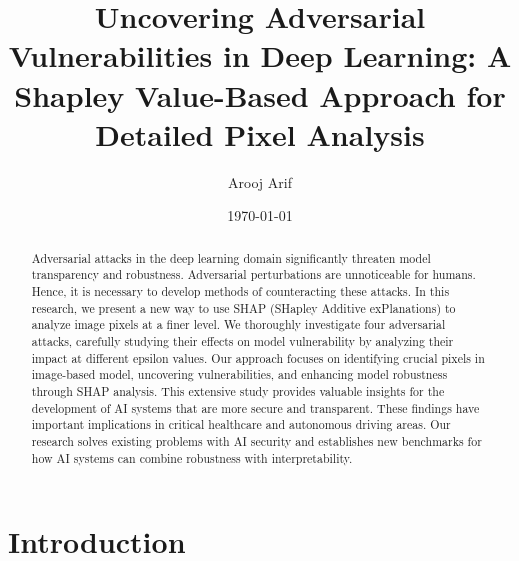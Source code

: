 \documentclass[10pt, conference, a4paper, final]{IEEEtran}
\title{Uncovering Adversarial Vulnerabilities in Deep Learning: A Shapley Value-Based Approach for Detailed Pixel Analysis}
\author{Arooj Arif}
\date{\today} %
\begin{document}
\maketitle %


\begin{abstract}    
    Adversarial attacks in the deep learning domain significantly threaten model transparency and robustness. Adversarial perturbations are unnoticeable for humans. Hence, it is necessary to develop methods of counteracting these attacks. In this research, we present a new way to use SHAP (SHapley Additive exPlanations) to analyze image pixels at a finer level. We thoroughly investigate four adversarial attacks, carefully studying their effects on model vulnerability by analyzing their impact at different epsilon values. Our approach focuses on identifying crucial pixels in image-based model, uncovering vulnerabilities, and enhancing model robustness through SHAP analysis. This extensive study provides valuable insights for the development of AI systems that are more secure and transparent. These findings have important implications in critical healthcare and autonomous driving areas. Our research solves existing problems with AI security and establishes new benchmarks for how AI systems can combine robustness with interpretability.
\end{abstract}

\section{Introduction}
\end{document}
